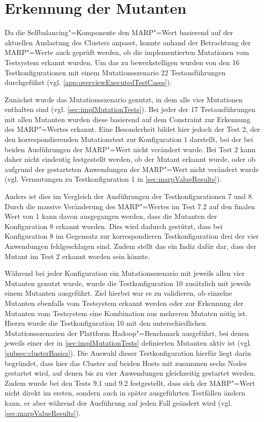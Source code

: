 \section{Erkennung der Mutanten}
\label{sec:killingMutants}

Da die Selfbalancing"=Komponente den \gls{MARP}"=Wert basierend auf der aktuellen Auslastung des Clusters anpasst, konnte anhand der Betrachtung der \gls{MARP}"=Werte auch geprüft werden, ob die implementierten Mutationen vom Testsystem erkannt wurden.
Um das zu bewerkstelligen wurden von den 16 Testkonfigurationen mit einem Mutationsszenario 22 Testausführungen durchgeführt (vgl. \cref{app:overviewExecutedTestCases}).

Zunächst wurde das Mutationsszenario genutzt, in dem alle vier Mutationen enthalten sind (vgl. \cref{sec:implMutationTests}).
Bei jeder der 17 Testausführungen mit allen Mutanten wurden diese basierend auf dem Constraint zur Erkennung des \gls{MARP}"=Wertes erkannt.
Eine Besonderheit bildet hier jedoch der Test 2, der den korrespondierenden Mutationstest zur Konfiguration 1 darstellt, bei der bei beiden Ausführungen der \gls{MARP}"=Wert nicht verändert wurde.
Bei Test 2 kann daher nicht eindeutig festgestellt werden, ob der Mutant erkannt wurde, oder ob aufgrund der gestarteten Anwendungen der \gls{MARP}"=Wert nicht verändert wurde (vgl. Vermutungen zu Testkonfiguration 1 in \cref{sec:marpValueResults}).

Anders ist dies im Vergleich der Ausführungen der Testkonfigurationen 7 und 8.
Durch die massive Veränderung des \gls{MARP}"=Wertes im Test 7.2 auf den finalen Wert von 1 kann davon ausgegangen werden, dass die Mutanten der Konfiguration 8 erkannt wurden.
Dies wird dadurch gestützt, dass bei Konfiguration 8 im Gegensatz zur korrespondieren Testkonfiguration drei der vier Anwendungen fehlgeschlagen sind.
Zudem stellt das ein Indiz dafür dar, dass der Mutant im Test 2 erkannt worden sein könnte.

Während bei jeder Konfiguration ein Mutationsszenario mit jeweils allen vier Mutanten genutzt wurde, wurde die Testkonfiguration 10 zusätzlich mit jeweils einem Mutanten ausgeführt.
Ziel hierbei war es zu validieren, ob einzelne Mutanten ebenfalls vom Testsystem erkannt werden oder zur Erkennung der Mutanten vom Testsystem eine Kombination aus mehreren Mutaten nötig ist.
Hierzu wurde die Testkonfiguration 10 mit den unterschiedlichen Mutationsszenarien der Plattform Hadoop"=Benchmark ausgeführt, bei denen jeweils einer der in \cref{sec:implMutationTests} definierten Mutanten aktiv ist (vgl. \cref{subsec:clusterBasics}).
Die Auswahl dieser Testkonfiguration hierfür liegt darin begründet, dass hier das Cluster auf beiden Hosts mit zusammen sechs Nodes gestartet wird, auf denen bis zu vier Anwendungen gleichzeitig gestartet werden.
Zudem wurde bei den Tests 9.1 und 9.2 festgestellt, dass sich der \gls{MARP}"=Wert nicht direkt im ersten, sondern auch in später ausgeführten Testfällen ändern kann, er aber während der Ausführung auf jeden Fall geändert wird (vgl. \cref{sec:marpValueResults}).


